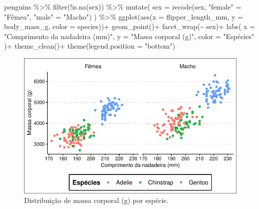 \documentclass[
  12pt,
  letterpaper,
  DIV=11,
  numbers=noendperiod]{scrreprt}
\newenvironment{Shaded}{\begin{snugshade}}{\end{snugshade}}
\newcommand{\AttributeTok}[1]{\textcolor[rgb]{0.40,0.45,0.13}{#1}}
\newcommand{\FunctionTok}[1]{\textcolor[rgb]{0.28,0.35,0.67}{#1}}
\newcommand{\NormalTok}[1]{\textcolor[rgb]{0.00,0.23,0.31}{#1}}
\newcommand{\OtherTok}[1]{\textcolor[rgb]{0.00,0.23,0.31}{#1}}
\newcommand{\SpecialCharTok}[1]{\textcolor[rgb]{0.37,0.37,0.37}{#1}}
\newcommand{\StringTok}[1]{\textcolor[rgb]{0.13,0.47,0.30}{#1}}
\theoremstyle{definition}
\theoremstyle{exemplo}
\begin{document}
\begin{Shaded}
\begin{Highlighting}[]
\NormalTok{penguins }\SpecialCharTok{\%\textgreater{}\%} 
  \FunctionTok{filter}\NormalTok{(}\SpecialCharTok{!}\FunctionTok{is.na}\NormalTok{(sex)) }\SpecialCharTok{\%\textgreater{}\%} 
  \FunctionTok{mutate}\NormalTok{(}
  \AttributeTok{sex =} \FunctionTok{recode}\NormalTok{(sex,}
         \StringTok{"female"} \OtherTok{=} \StringTok{"Fêmea"}\NormalTok{,}
         \StringTok{"male"} \OtherTok{=} \StringTok{"Macho"}\NormalTok{)}
\NormalTok{  ) }\SpecialCharTok{\%\textgreater{}\%} 
  \FunctionTok{ggplot}\NormalTok{(}\FunctionTok{aes}\NormalTok{(}\AttributeTok{x =}\NormalTok{ flipper\_length\_mm, }\AttributeTok{y =}\NormalTok{ body\_mass\_g, }\AttributeTok{color =}\NormalTok{ species))}\SpecialCharTok{+}
    \FunctionTok{geom\_point}\NormalTok{()}\SpecialCharTok{+}
    \FunctionTok{facet\_wrap}\NormalTok{(}\SpecialCharTok{\textasciitilde{}}\NormalTok{ sex)}\SpecialCharTok{+}
    \FunctionTok{labs}\NormalTok{(}
      \AttributeTok{x =} \StringTok{"Comprimento da nadadeira (mm)"}\NormalTok{,}
      \AttributeTok{y =} \StringTok{"Massa corporal (g)"}\NormalTok{,}
      \AttributeTok{color =} \StringTok{"Espécies"}
\NormalTok{    )}\SpecialCharTok{+}
    \FunctionTok{theme\_clean}\NormalTok{()}\SpecialCharTok{+}
    \FunctionTok{theme}\NormalTok{(}\AttributeTok{legend.position =} \StringTok{"bottom"}\NormalTok{)}
\end{Highlighting}
\end{Shaded}

\begin{figure}[H]

{\centering \includegraphics{03-tidyverse_files/figure-pdf/unnamed-chunk-30-1.pdf}

}

\caption{Distribuição de massa corporal (g) por espécie.}

\end{figure}%
\end{document}
